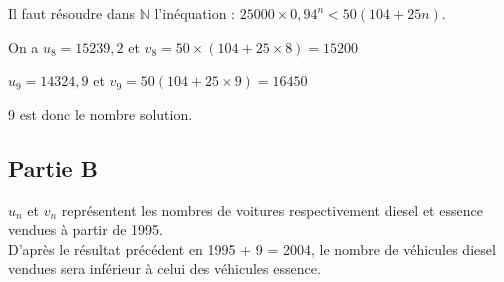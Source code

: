	Il faut résoudre dans $\mathbb{N}$ l’inéquation : $25000 \times 0,94^n < 50(104 + 25n)$.
	
	On a $u_8 = 15239,2$ et $v_8 = 50 \times (104 + 25 \times 8) = 15200$
	
	$u_9 = 14324,9$ et $v_9 = 50(104 + 25 \times 9) = 16450$
	
	9 est donc le nombre solution.
	
	\subsection*{Partie B}
	 $u_n$ et $v_n$ représentent les nombres de voitures respectivement diesel et essence vendues à partir de 1995.\\ D’après le résultat précédent en 1995 + 9 = 2004, le nombre de véhicules diesel vendues sera inférieur à celui des véhicules essence.
